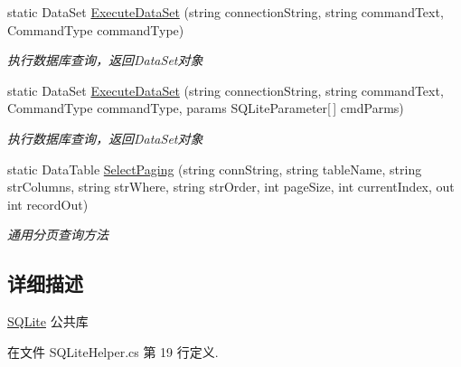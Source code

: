 \begin{DoxyCompactItemize}
static Data\-Set \hyperlink{class_x_c_l_net_tools_1_1_data_base_1_1_s_q_lite_1_1_s_q_lite_helper_a4806433651289941b9507696bb3a64d0}{Execute\-Data\-Set} (string connection\-String, string command\-Text, Command\-Type command\-Type)
\begin{DoxyCompactList}\small\item\em 执行数据库查询，返回\-Data\-Set对象 \end{DoxyCompactList}\item 
static Data\-Set \hyperlink{class_x_c_l_net_tools_1_1_data_base_1_1_s_q_lite_1_1_s_q_lite_helper_a58876af7deacc80974cddb8b1feddee5}{Execute\-Data\-Set} (string connection\-String, string command\-Text, Command\-Type command\-Type, params S\-Q\-Lite\-Parameter\mbox{[}$\,$\mbox{]} cmd\-Parms)
\begin{DoxyCompactList}\small\item\em 执行数据库查询，返回\-Data\-Set对象 \end{DoxyCompactList}\item 
static Data\-Table \hyperlink{class_x_c_l_net_tools_1_1_data_base_1_1_s_q_lite_1_1_s_q_lite_helper_ac6c40082dce532c8ea61efc23c00a825}{Select\-Paging} (string conn\-String, string table\-Name, string str\-Columns, string str\-Where, string str\-Order, int page\-Size, int current\-Index, out int record\-Out)
\begin{DoxyCompactList}\small\item\em 通用分页查询方法 \end{DoxyCompactList}\end{DoxyCompactItemize}


\subsection{详细描述}
\hyperlink{namespace_x_c_l_net_tools_1_1_data_base_1_1_s_q_lite}{S\-Q\-Lite} 公共库 



在文件 S\-Q\-Lite\-Helper.\-cs 第 19 行定义.



